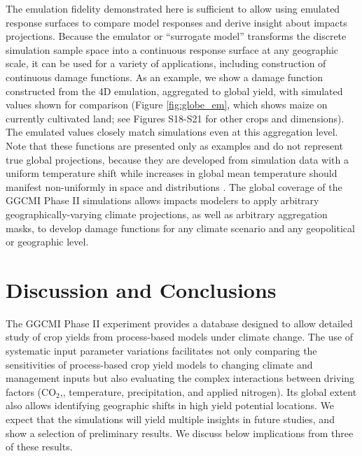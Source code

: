 \documentclass[gmd, manuscript]{copernicus} %
\begin{document}
The emulation fidelity demonstrated here is sufficient to allow using emulated response surfaces to compare model responses and derive insight about impacts projections. Because the emulator or ``surrogate model'' transforms the discrete simulation sample space into a continuous response surface at any geographic scale, it can be used for a variety of applications, including construction of continuous damage functions. As an example, we show a damage function constructed from the 4D emulation, aggregated to global yield, with simulated values shown for comparison (Figure \ref{fig:globe_em}, which shows maize on currently cultivated land; see Figures S18-S21 for other crops and dimensions). The emulated values closely match simulations even at this aggregation level. Note that these functions are presented only as examples and do not represent true global projections, because they are developed from simulation data with a uniform temperature shift while increases in global mean temperature should manifest non-uniformly in space and distributions \citep{Sippel2015}. The global coverage of the GGCMI Phase II simulations allows impacts modelers to apply arbitrary geographically-varying climate projections, as well as arbitrary aggregation masks, to develop damage functions for any climate scenario and any geopolitical or geographic level.


\section{Discussion and Conclusions} 
\label{S:6}
The GGCMI Phase II experiment provides a database designed to allow detailed study of crop yields from process-based models under climate change. The use of systematic input parameter variations facilitates not only comparing the sensitivities of process-based crop yield models to changing climate and management inputs but also evaluating the complex interactions between driving factors (CO$_2$,, temperature, precipitation, and applied nitrogen). Its global extent also allows identifying geographic shifts in high yield potential locations. We expect that the simulations will yield multiple insights in future studies, and show a selection of preliminary results. We discuss below implications from three of these results.
\end{document}
